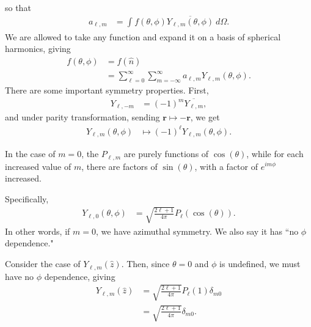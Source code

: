 \documentclass[10pt]{mypackage}
\begin{document}
  so that
  \begin{align*}
    a_{\ell,m} &= \int_{}^{} f\left( \theta,\phi \right) \overline{Y_{\ell,m}\left( \theta,\phi \right)}\:d\Omega.
  \end{align*}
  We are allowed to take any function and expand it on a basis of spherical harmonics, giving
  \begin{align*}
    f\left( \theta,\phi \right) &= f\left( \hat{n} \right)\\
                                &= \sum_{\ell=0}^{\infty}\sum_{m=-\infty}^{\infty}a_{\ell,m}Y_{\ell,m}\left( \theta,\phi \right).
  \end{align*}
  There are some important symmetry properties. First,
  \begin{align*}
    Y_{\ell,-m} &= \left( -1 \right)^{m} \overline{Y_{\ell,m}},
  \end{align*}
  and under parity transformation, sending $\mathbf{r}\mapsto -\mathbf{r}$, we get
  \begin{align*}
    Y_{\ell,m}\left( \theta,\phi \right) &\mapsto \left( -1 \right)^{\ell}Y_{\ell,m}\left( \theta,\phi \right).
  \end{align*}
  \begin{example}
    In the case of $m = 0$, the $P_{\ell, m}$ are purely functions of $\cos\left( \theta \right)$, while for each increased value of $m$, there are factors of $\sin\left( \theta \right)$, with a factor of $e^{im\phi}$ increased.\newline

    Specifically, 
    \begin{align*}
      Y_{\ell,0} \left( \theta,\phi \right) &= \sqrt{\frac{2\ell + 1}{4\pi}} P_{\ell}\left( \cos\left( \theta \right) \right).
    \end{align*}
    In other words, if $m = 0$, we have azimuthal symmetry. We also say it has ``no $\phi$ dependence."
  \end{example}
  \begin{example}
    Consider the case of $Y_{\ell,m}\left( \hat{z} \right)$. Then, since $\theta = 0$ and $\phi$ is undefined, we must have no $\phi$ dependence, giving
    \begin{align*}
      Y_{\ell,m}\left( \hat{z} \right) &= \sqrt{\frac{2\ell + 1}{4\pi}} P_{\ell}\left( 1 \right)\delta_{m0}\\
                                       &= \sqrt{\frac{2\ell + 1}{4\pi}} \delta_{m 0}.
    \end{align*}
  \end{example}
\end{document}
